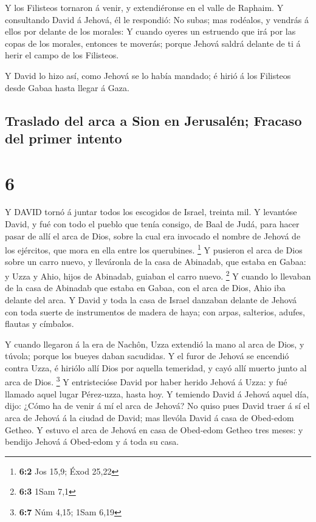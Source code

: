  Y los Filisteos tornaron á venir, y extendiéronse en el
valle de Raphaim.  Y consultando David á Jehová, él le
respondió: No subas; mas rodéalos, y vendrás á ellos por delante de los
morales:  Y cuando oyeres un estruendo que irá por las
copas de los morales, entonces te moverás; porque Jehová saldrá delante
de ti á herir el campo de los Filisteos.

 Y David lo hizo así, como Jehová se lo había mandado; é
hirió á los Filisteos desde Gabaa hasta llegar á Gaza.

\hypertarget{traslado-del-arca-a-sion-en-jerusaluxe9n-fracaso-del-primer-intento}{%
\subsection{Traslado del arca a Sion en Jerusalén; Fracaso del primer
intento}\label{traslado-del-arca-a-sion-en-jerusaluxe9n-fracaso-del-primer-intento}}

\hypertarget{section-5}{%
\section{6}\label{section-5}}

 Y DAVID tornó á juntar todos los escogidos de Israel,
treinta mil.  Y levantóse David, y fué con todo el pueblo
que tenía consigo, de Baal de Judá, para hacer pasar de allí el arca de
Dios, sobre la cual era invocado el nombre de Jehová de los ejércitos,
que mora en ella entre los querubines. \footnote{\textbf{6:2} Jos 15,9;
  Éxod 25,22}  Y pusieron el arca de Dios sobre un carro
nuevo, y lleváronla de la casa de Abinadab, que estaba en Gabaa: y Uzza
y Ahio, hijos de Abinadab, guiaban el carro nuevo. \footnote{\textbf{6:3}
  1Sam 7,1}  Y cuando lo llevaban de la casa de Abinadab que
estaba en Gabaa, con el arca de Dios, Ahio iba delante del arca.
 Y David y toda la casa de Israel danzaban delante de Jehová
con toda suerte de instrumentos de madera de haya; con arpas, salterios,
adufes, flautas y címbalos.

 Y cuando llegaron á la era de Nachôn, Uzza extendió la mano
al arca de Dios, y túvola; porque los bueyes daban sacudidas.
 Y el furor de Jehová se encendió contra Uzza, é hiriólo
allí Dios por aquella temeridad, y cayó allí muerto junto al arca de
Dios. \footnote{\textbf{6:7} Núm 4,15; 1Sam 6,19}  Y
entristecióse David por haber herido Jehová á Uzza: y fué llamado aquel
lugar Pérez-uzza, hasta hoy.  Y temiendo David á Jehová
aquel día, dijo: ¿Cómo ha de venir á mí el arca de Jehová? 
No quiso pues David traer á sí el arca de Jehová á la ciudad de David;
mas llevóla David á casa de Obed-edom Getheo.  Y estuvo el
arca de Jehová en casa de Obed-edom Getheo tres meses: y bendijo Jehová
á Obed-edom y á toda su casa.

